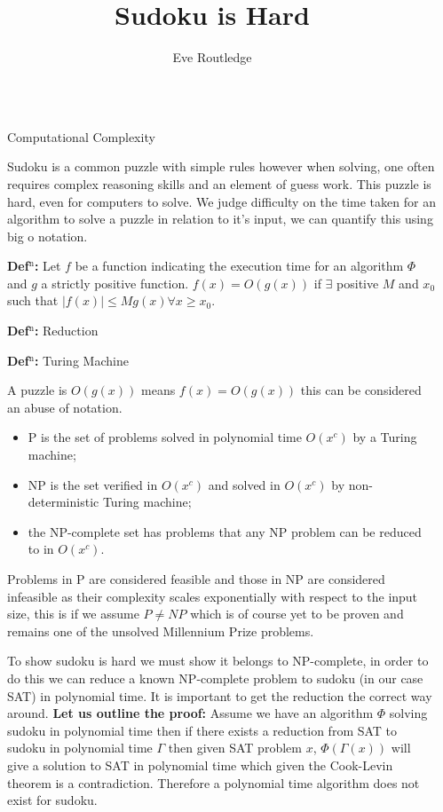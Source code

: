 \documentclass[final]{beamer}
\title{Sudoku is Hard}
\author{Eve Routledge}
\newlength{\sepwidth}
\newlength{\colwidth}
\newcounter{col}
\newcommand{\separatorcolumn}{\begin{column}{\sepwidth}\end{column}}
\begin{document}
\begin{frame}[t]
\begin{columns}[t]
\separatorcolumn

\begin{column}{\colwidth}

  \begin{block}{Computational Complexity}

Sudoku is a common puzzle with simple rules however when solving, one often requires complex reasoning skills and an element of guess work. This puzzle is hard, even for computers to solve. We judge difficulty on the time taken for an algorithm to solve a puzzle in relation to it's input, we can quantify this using big o notation.

\textbf{Def$^\text{n}$:} Let $f$ be a function indicating the execution time for an algorithm $\Phi$ and $g$ a strictly positive function. $f(x)=O (g(x))$ if $\exists$ positive $ M$ and $x_0$ such that $|f(x)|\leq Mg(x)\forall x\geq x_0$.

\textbf{Def$^\text{n}$:} Reduction

\textbf{Def$^\text{n}$:} Turing Machine

A puzzle is $O(g(x))$ means $f(x)=O(g(x))$ this can be considered an abuse of notation.

 \begin{itemize}
	\item{P is the set of problems solved in polynomial time $O(x^c)$ by a Turing machine;} 
	\item{NP is the set verified in $O(x^c)$ and solved in $O(x^c)$ by non-deterministic Turing machine;} 
	\item{the NP-complete set has problems that any NP problem can be reduced to in $O(x^c)$.} 
\end{itemize}
Problems in P are considered feasible and those in NP are considered infeasible as their complexity scales exponentially with respect to the input size, this is if we assume $P\neq NP$ which is of course yet to be proven and remains one of the unsolved Millennium Prize problems.

To show sudoku is hard we must show it belongs to NP-complete, in order to do this we can reduce a known NP-complete problem to sudoku (in our case SAT) in polynomial time. It is important to get the reduction the correct way around. \textbf{Let us outline the proof:} Assume we have an algorithm $\Phi$ solving sudoku in polynomial time then if there exists a reduction from SAT to sudoku in polynomial time $\Gamma$ then given SAT problem $x$, $\Phi(\Gamma(x))$ will give a solution to SAT in polynomial time which given the Cook-Levin theorem is a contradiction. Therefore a polynomial time algorithm does not exist for sudoku.


\end{block}
\end{column}
\end{columns}
\end{frame}
\end{document}
